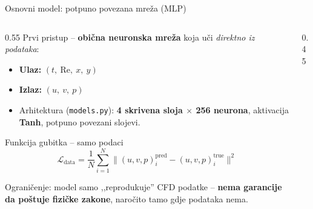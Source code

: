 \documentclass[10pt,aspectratio=169]{beamer}
\begin{document}
\begin{frame}{Osnovni model: potpuno povezana mreža (MLP)}
  \begin{columns}[T]
    \begin{column}{0.55\textwidth}
      \small
      Prvi pristup -- \textbf{obična neuronska mreža} koja uči \emph{direktno iz podataka}:
      \medskip
      \begin{itemize}
        \item \textbf{Ulaz:} $(t,\ \mathrm{Re},\ x,\ y)$
        \item \textbf{Izlaz:} $(u,\ v,\ p)$
        \item Arhitektura (\texttt{models.py}): \textbf{4 skrivena sloja $\times$ 256 neurona},
              aktivacija \textbf{Tanh}, potpuno povezani slojevi.
      \end{itemize}
      \medskip
      \begin{block}{Funkcija gubitka -- samo podaci}
        \[
          \mathcal{L}_{\text{data}}
          = \frac{1}{N}\sum_{i=1}^{N}
            \big\| (u,v,p)^{\text{pred}}_i - (u,v,p)^{\text{true}}_i \big\|^2
        \]
      \end{block}
      \alert{Ograničenje:} model samo ,,reprodukuje'' CFD podatke --
      \textbf{nema garancije da poštuje fizičke zakone}, naročito tamo gdje podataka nema.
    \end{column}
    \begin{column}{0.45\textwidth}
      \centering
    \end{column}
  \end{columns}
\end{frame}
\end{document}
